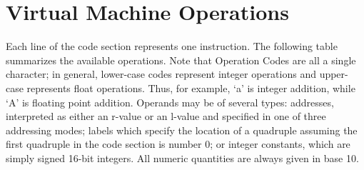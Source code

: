 \documentclass[12pt]{article}
\begin{document}
\section*{Virtual Machine Operations}
     Each line of the code section represents one instruction. The following table summarizes the available operations.
Note that Operation Codes are all a single character; in general, lower-case codes represent integer operations
and upper-case represents float operations. Thus, for example, `a' is integer addition, while `A' is floating point addition.
Operands may be of several types: addresses, interpreted as either an r-value or an l-value and specified in one of three
addressing modes; labels which specify the location of a quadruple assuming the first quadruple in the code section
is number 0; or integer constants, which are simply signed 16-bit integers. All numeric quantities are always given in base 10.
\end{document}
